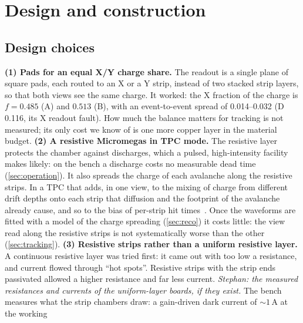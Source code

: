 \section{Design and construction}\label{sec:design}

\subsection{Design choices}\label{sec:design_choices}
\textbf{(1) Pads for an equal X/Y charge share.} The readout is a single plane of square pads, each routed to an X
or a Y strip, instead of two stacked strip layers, so that both views see the same charge. It worked: the X fraction of
the charge is $f=0.485$ (A) and $0.513$ (B), with an event-to-event spread of 0.014--0.032 (D 0.116, its X
readout fault). How much the balance matters for tracking is not measured; its only cost we know of is one more copper
layer in the material budget.
\textbf{(2) A resistive Micromegas in TPC mode.} The resistive layer protects the chamber against discharges, which a
pulsed, high-intensity facility makes likely: on the bench a discharge costs no measurable dead time
(\cref{sec:operation}). It also spreads the charge of each avalanche along the resistive strips. In a TPC that adds, in
one view, to the mixing of charge from different drift depths onto each strip that diffusion and the footprint of the
avalanche already cause, and so to the bias of per-strip hit times~\cite{paperIIb}. Once the waveforms are fitted with
a model of the charge spreading (\cref{sec:reco}) it costs little: the view read along the resistive strips is not
systematically worse than the other (\cref{sec:tracking}).
\textbf{(3) Resistive strips rather than a uniform resistive layer.} A continuous resistive layer was tried
first: it came out with too low a resistance, and current flowed through ``hot spots''. Resistive strips with the
strip ends passivated allowed a higher resistance and far less current. \emph{Stephan: the measured resistances and
currents of the uniform-layer boards, if they exist.} The bench measures what the strip chambers draw: a gain-driven dark current of ${\sim}1$\,\textmu A at the working
